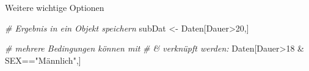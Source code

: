 \documentclass[ignorenonframetext,]{beamer}
\newenvironment{Shaded}{}{}
\newcommand{\DecValTok}[1]{\textcolor[rgb]{0.25,0.63,0.44}{{#1}}}
\newcommand{\StringTok}[1]{\textcolor[rgb]{0.25,0.44,0.63}{{#1}}}
\newcommand{\CommentTok}[1]{\textcolor[rgb]{0.38,0.63,0.69}{\textit{{#1}}}}
\newcommand{\NormalTok}[1]{{#1}}
\begin{document}
\begin{frame}[fragile]{Weitere wichtige Optionen}

\begin{Shaded}
\begin{Highlighting}[]
\CommentTok{# Ergebnis in ein Objekt speichern}
\NormalTok{subDat <-}\StringTok{ }\NormalTok{Daten[Dauer>}\DecValTok{20}\NormalTok{,]}
\end{Highlighting}
\end{Shaded}

\begin{Shaded}
\begin{Highlighting}[]
\CommentTok{# mehrere Bedingungen können mit}
\CommentTok{# & verknüpft werden:}
\NormalTok{Daten[Dauer>}\DecValTok{18} \NormalTok{&}\StringTok{ }\NormalTok{SEX==}\StringTok{"Männlich"}\NormalTok{,]}
\end{Highlighting}
\end{Shaded}


\end{frame}
\end{document}
